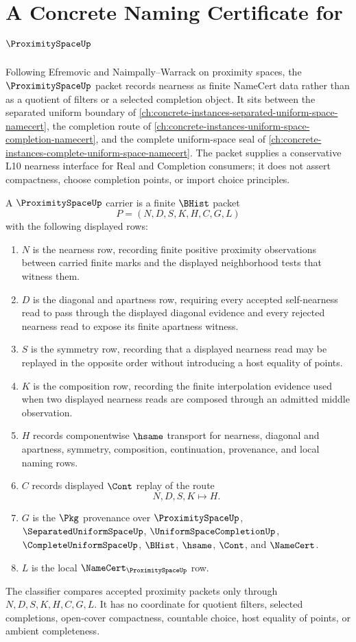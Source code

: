 \chapter{A Concrete Naming Certificate for $\ProximitySpaceUp$}
\label{ch:concrete-instances-proximity-space-namecert}

Following Efremovic and Naimpally--Warrack on proximity spaces, the $\ProximitySpaceUp$ packet records nearness as finite NameCert data rather than as a quotient of filters or a selected completion object. It sits between the separated uniform boundary of \autoref{ch:concrete-instances-separated-uniform-space-namecert}, the completion route of \autoref{ch:concrete-instances-uniform-space-completion-namecert}, and the complete uniform-space seal of \autoref{ch:concrete-instances-complete-uniform-space-namecert}. The packet supplies a conservative L10 nearness interface for Real and Completion consumers; it does not assert compactness, choose completion points, or import choice principles.

\begin{definition}
\label{def:proximity-space-carrier}
A $\ProximitySpaceUp$ carrier is a finite $\BHist$ packet
$$
P=(N,D,S,K,H,C,G,L)
$$
with the following displayed rows:
\begin{enumerate}
\item $N$ is the nearness row, recording finite positive proximity observations between carried finite marks and the displayed neighborhood tests that witness them.
\item $D$ is the diagonal and apartness row, requiring every accepted self-nearness read to pass through the displayed diagonal evidence and every rejected nearness read to expose its finite apartness witness.
\item $S$ is the symmetry row, recording that a displayed nearness read may be replayed in the opposite order without introducing a host equality of points.
\item $K$ is the composition row, recording the finite interpolation evidence used when two displayed nearness reads are composed through an admitted middle observation.
\item $H$ records componentwise $\hsame$ transport for nearness, diagonal and apartness, symmetry, composition, continuation, provenance, and local naming rows.
\item $C$ records displayed $\Cont$ replay of the route
$$
N,D,S,K \longmapsto H .
$$
\item $G$ is the $\Pkg$ provenance over $\ProximitySpaceUp$, $\SeparatedUniformSpaceUp$, $\UniformSpaceCompletionUp$, $\CompleteUniformSpaceUp$, $\BHist$, $\hsame$, $\Cont$, and $\NameCert$.
\item $L$ is the local $\NameCert_{\ProximitySpaceUp}$ row.
\end{enumerate}
The classifier compares accepted proximity packets only through $N,D,S,K,H,C,G,L$. It has no coordinate for quotient filters, selected completions, open-cover compactness, countable choice, host equality of points, or ambient completeness.
\end{definition}

